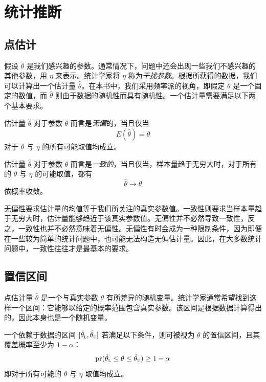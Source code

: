 \section{统计推断}
\label{sec::statistical-inference}

\subsection{点估计}


假设 $\theta$ 是我们感兴趣的参数。通常情况下，问题中还会出现一些我们不感兴趣的其他参数，用 $\eta$ 来表示。统计学家将 $\eta$ 称为{\it 干扰参数}。根据所获得的数据，我们可以计算出一个估计量 $\hat\theta$。在本书中，我们采用频率派的视角，即假定 $\theta$ 是一个固定的数值，而 $\hat\theta$ 则由于数据的随机性而具有随机性。一个估计量需要满足以下两个基本要求。 

\begin{definition}
[无偏性]\label{def::unbiasedness}
估计量 $\hat\theta$ 对于参数 $\theta$ 而言是{\it 无偏}的，当且仅当
$$
E(\hat\theta) = \theta
$$
对于 $\theta$ 与 $\eta$ 的所有可能取值均成立。 
\end{definition}



\begin{definition}
[一致性]\label{def::consistency}
估计量 $\hat\theta$ 对于参数 $\theta$ 而言是{\it 一致的}，当且仅当，样本量趋于无穷大时，对于所有的 $\theta$ 与 $\eta$ 的可能取值，都有$$
 \hat\theta  \rightarrow \theta
$$依概率收敛。 
\end{definition}


无偏性要求估计量的均值等于我们所关注的真实参数值。一致性则要求当样本量趋于无穷大时，估计量能够趋近于该真实参数值。无偏性并不必然导致一致性，反之，一致性也并不必然意味着无偏性。无偏性有时会成为一种限制条件，因为即便在一些较为简单的统计问题中，也可能无法构造无偏估计量。因此，在大多数统计问题中，一致性往往才是最基本的要求。





\subsection{置信区间}



点估计量 $\hat\theta$ 是一个与真实参数 $\theta$ 有所差异的随机变量。统计学家通常希望找到这样一个区间：它能够以给定的概率范围包含真实参数。该区间是根据数据计算得出的，因此本身也是一个随机变量。 

\begin{definition}
[置信区间]\label{def::confidence-interval}
一个依赖于数据的区间 $[  \hat\theta_\textsc{l} , \hat\theta_\textsc{u} ] $ 若满足以下条件，则可被视为 $\theta$ 的置信区间，且其覆盖概率至少为 $1-\alpha$：
$$
\textup{pr}(    \hat\theta_\textsc{l}    \leq \theta \leq  \hat\theta_\textsc{u}  ) \geq 1-\alpha 
$$
即对于所有可能的 $\theta$ 与 $\eta$ 取值均成立。  
\end{definition}


